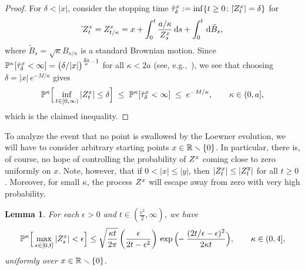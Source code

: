 \documentclass[a4paper, 11pt]{article}
\newtheorem{lem}[thm]{Lemma}
\theoremstyle{definition}
\numberwithin{equation}{section}
\numberwithin{figure}{section}
\newcommand{\bessel}[1][]{{\ifx&#1&\else{^{#1 \!}}\fi}Z}
\newcommand{\BMmeasure}[2][]{\bP^{#2}_{\!#1}}
\begin{document}
\begin{proof}
For $\delta < |x|$, consider the stopping time 
$\tilde\tau^x_\delta := \inf\{t \ge 0 \colon |\tilde \bessel^x_t| = \delta\}$ for 
\begin{align*}
\tilde \bessel^x_t = \bessel^x_{t/\kappa}
= x + \int_0^t \frac{a/\kappa}{\bessel^x_s}\ud s + \int_0^t  \ud \tilde B_s,
\end{align*}
where $\tilde B_s = \sqrt{\kappa}B_{s/\kappa}$ is a standard Brownian motion. 
Since 
$\BMmeasure{\kappa}[\tilde\tau^x_\delta < \infty] = \big(\delta/|x|\big)^{\frac{2a}{\kappa}-1}$ for all $\kappa < 2a$ 
(see, e.g.,~\cite{Lawler:Conformally_invariant_processes_in_the_plane,Kemppainen:SLE_book, Lawler:SLE_book_draft}), 
we see that choosing $\delta = |x| \, e^{-M/a}$ gives 
\begin{align*}
\BMmeasure{\kappa}\Big[\inf_{t \in [0,\infty)}|\bessel^x_t| \le \delta\Big] \; \le \; \BMmeasure{\kappa}[\tilde\tau^x_\delta < \infty] 
\; \le \; e^{-M/\kappa} ,
\qquad \kappa \in (0,a] ,
\end{align*}
which is the claimed inequality.
\end{proof}

To analyze the event that no point is swallowed by the Loewner evolution, 
we will have to consider arbitrary starting points $x \in \mathbb{R} \smallsetminus \{0\}$. 
In particular, there is, of course, no hope of controlling 
the probability of $\bessel^x$ coming close to zero uniformly on $x$. 
Note, however, that if $0 < |x| \leq |y|$, then $|\bessel^x_t| \leq |\bessel^y_t|$ for all $t \geq 0$.
Moreover, for small $\kappa$, the process $\bessel^x$ will escape away from zero with very high probability. 


\begin{lem}\label{thm:harmonic-measure-stays-small-estimate}
For each $\epsilon > 0$ and $t \in (\tfrac{\epsilon^2}{2} ,\infty)$, we have
\begin{align}\label{eq:harmonic-measure-stays-small-estimate}
\BMmeasure{\kappa} \Big[ \max_{s \in [0,t]} |\bessel^x_s| < \epsilon\Big] 
\leq \sqrt{\frac{\kappa t}{2\pi}} \, \bigg(\frac{\epsilon}{2t-\epsilon^2}\bigg) \, \exp \Big(\!\! -\frac{(2t/\epsilon - \epsilon)^2}{2 \kappa t} \Big) , \qquad \kappa \in (0,4] ,
\end{align}
uniformly over $x \in \mathbb{R} \smallsetminus \{0\}$.
\end{lem}
\end{document}
